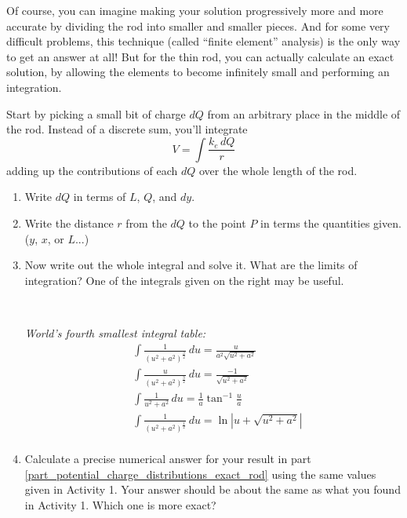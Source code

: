 Of course, you can imagine making your solution progressively more and more accurate by dividing the rod into smaller and smaller pieces.  And for some very difficult problems, this technique (called ``finite element'' analysis) is the only way to get an answer at all!  But for the thin rod, you can actually calculate an exact solution, by allowing the elements to become infinitely small and performing an integration.

Start by picking a small bit of charge $dQ$ from an arbitrary place in the middle of the rod.  Instead of a discrete sum, you'll integrate
$$V=\int{\frac{k_e\,dQ}{r}}$$
adding up the contributions of each $dQ$ over the whole length of the rod.
\begin{enumerate}[labparts]

\pagebreak[2]
\item Write $dQ$ in terms of $L$, $Q$, and $dy$.
\answerspace{0.3in}

\item Write the distance $r$ from the $dQ$ to the point $P$ in terms the quantities given.  ($y$, $x$, or $L$...) 
\answerspace{0.4in}

\item Now write out the whole integral and solve it.  What are the limits of integration?  One of the integrals given on the right may be useful. \label{part_potential_charge_distributions_exact_rod}

\begin{minipage}{0.65\textwidth}
\
\end{minipage}
\begin{minipage}{0.34\textwidth}

\textit{World's fourth smallest integral table:}
\begin{align*}
&\int \! \frac{1}{\left (u^2 + a^2 \right )^\frac{3}{2}} \, du=\frac{u}{a^2 \sqrt{u^2 + a^2}} \\
&\int \! \frac{u}{\left (u^2 + a^2 \right )^\frac{3}{2}} \, du=\frac{-1}{\sqrt{u^2 + a^2}} \\
&\int \! \frac{1}{u^2 + a^2} \, du=\frac{1}{a} \tan^{-1} \frac{u}{a} \\
&\int \! \frac{1}{\left (u^2 + a^2 \right )^\frac{1}{2}} \, du=\ln \left | u + \sqrt{u^2 + a^2} \right| \\
\end{align*}
\end{minipage}
\item Calculate a precise numerical answer for your result in part \ref{part_potential_charge_distributions_exact_rod} using the same values given in Activity 1.  Your answer should be about the same as what you found in Activity 1.  Which one is more exact?
\answerspace{0.4in}

\end{enumerate}

